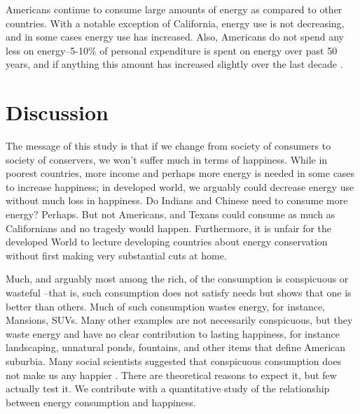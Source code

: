 \documentclass[10pt, letterpaper]{article}
\begin{document}
\begin{spacing}{1.4}
Americans continue to consume large amounts of energy as compared to other
countries.  With a notable exception of California, energy use is
not decreasing, and in some cases energy use has increased. 
Also, Americans do not spend any less  on energy--5-10\% of personal
expenditure is spent on energy over past 50 years, and if anything this amount
has  increased slightly  over the last decade \cite{bea-2-8-5}.


\section*{\large \bf Discussion}


The message of this study is that if we change from society of consumers
to society of conservers, we won't suffer much in terms of
happiness. While in poorest countries, more  income and perhaps more energy
 is needed in some cases to increase happiness; in developed world, we arguably could  decrease
energy use without much loss in happiness. %
Do Indians and Chinese need to consume more energy? Perhaps. But not Americans, and
Texans could consume as much as Californians and no tragedy would
happen. Furthermore, it is unfair for the developed World to lecture developing
countries about energy conservation without first making very substantial cuts
at home.

Much, and  arguably most among the rich, of the consumption is conspicuous or
wasteful \cite{veblen05a, veblen05b}--that is, such consumption does not satisfy needs but shows that
one is better than others. Much of such consumption  wastes energy, for
instance, Mansions, SUVs.  Many other examples are not necessarily conspicuous, 
but they waste energy and have no clear contribution to lasting happiness, for
instance landscaping, unnatural ponds, fountains, and other items that
define American suburbia. Many social scientists suggested that conspicuous consumption
does not make us any happier  \cite{csikszentmihalyi99, frank04, frank05, frank12}. There are theoretical reasons to
expect it, but few actually test it. We contribute with a quantitative study of
the relationship between energy consumption and happiness. %


\end{spacing}
\end{document}
